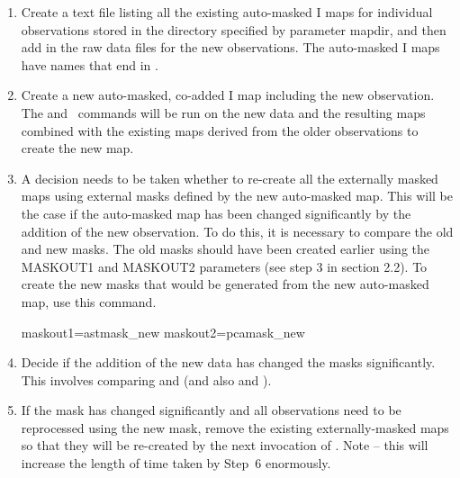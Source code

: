 \begin{enumerate}

\item Create a text file listing all the existing auto-masked I maps
  for individual observations stored in the directory specified by
  parameter mapdir, and then add in the raw data files for the new
  observations. The auto-masked I maps have names that end in
  .

\begin{terminalv}
\end{terminalv}


\item Create a new auto-masked, co-added I map including the new
  observation. The  and \makemap\ commands
  will be run on the new
  data and the resulting maps combined with the existing maps derived
  from the older observations to create the new map.

\begin{terminalv}
\end{terminalv}


\item A decision needs to be taken whether to re-create all the
  externally masked maps using external masks defined by the new
  auto-masked map. This will be the case if the auto-masked map has
  been changed significantly by the addition of the new
  observation. To do this, it is necessary to compare the old and new
  masks. The old masks should have been created earlier using the
  MASKOUT1 and MASKOUT2 parameters (see step 3 in section 2.2). To
  create the new masks that would be generated from the new
  auto-masked map, use this command.

\begin{terminalv}
maskout1=astmask_new           maskout2=pcamask_new
\end{terminalv}


\item Decide if the addition of the new data has changed the masks
  significantly. This involves comparing  and
   (and also  and
  ).


\item If the mask has changed significantly and all observations need
  to be reprocessed using the new mask, remove the existing
  externally-masked maps so that they will be re-created by the next
  invocation of .  Note -- this will increase the length of time
  taken by Step~6 enormously.


\end{enumerate}
